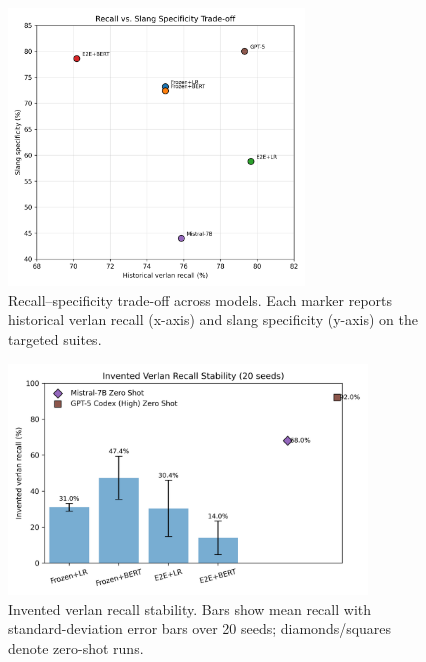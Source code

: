 \documentclass[12pt]{article}
\begin{document}
\begin{figure}[H]
    \centering
    \includegraphics[width=0.7\textwidth]{figures/historical_vs_slang_tradeoff.png}
    \caption{Recall--specificity trade-off across models.  Each marker reports historical verlan recall (x-axis) and slang specificity (y-axis) on the targeted suites.}
    \label{fig:tradeoff-scatter}
\end{figure}

\begin{figure}[H]
    \centering
    \includegraphics[width=0.85\textwidth]{figures/invented_recall_variance.png}
    \caption{Invented verlan recall stability.  Bars show mean recall with standard-deviation error bars over 20 seeds; diamonds/squares denote zero-shot runs.}
    \label{fig:invented-variance}
\end{figure}
\end{document}
